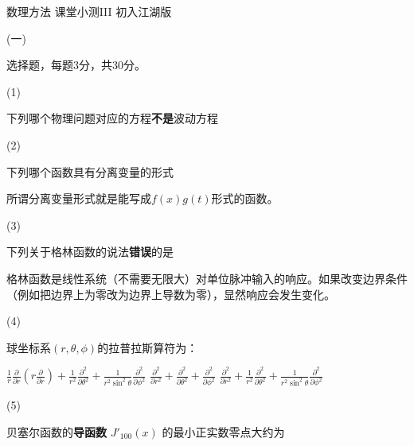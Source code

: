 \documentclass[12pt,CJK]{article}
\begin{document}
\bch
{\large 数理方法 课堂小测III 初入江湖版}

{\vskip 0.2in}

\bitem
\item[(一)]{选择题，每题3分，共30分。

  \bitem

\item[(1)]{下列哪个物理问题对应的方程{\bf 不是}波动方程 
  
}


\item[(2)]{下列哪个函数具有分离变量的形式 
  

{\red 所谓分离变量形式就是能写成$f(x)g(t)$形式的函数。}
}
  

\item[(3)]{下列关于格林函数的说法{\bf 错误}的是 
  

  {\red 格林函数是线性系统（不需要无限大）对单位脉冲输入的响应。如果改变边界条件（例如把边界上为零改为边界上导数为零），显然响应会发生变化。}
}


\item[(4)]{球坐标系$(r,\theta,\phi)$的拉普拉斯算符为： 
  
           {$\frac{1}{r}\frac{\partial}{\partial r}\left(r\frac{\partial}{\partial r}\right) + \frac{1}{r^2}\frac{\partial^2}{\partial \theta^2} + \frac{1}{r^2\sin^2\theta}\frac{\partial^2}{\partial \phi^2} $}
           {$\frac{\partial^2}{\partial r^2} + \frac{\partial^2}{\partial \theta^2} +\frac{\partial^2}{\partial \phi^2}$}
           {$\frac{\partial^2}{\partial r^2} + \frac{1}{r^2}\frac{\partial^2}{\partial \theta^2} + \frac{1}{r^2\sin^2\theta}\frac{\partial^2}{\partial \phi^2}$}
}  

\item[(5)]{贝塞尔函数的{\bf 导函数} $J'_{100}(x)$ 的最小正实数零点大约为 


}}
\end{document}
